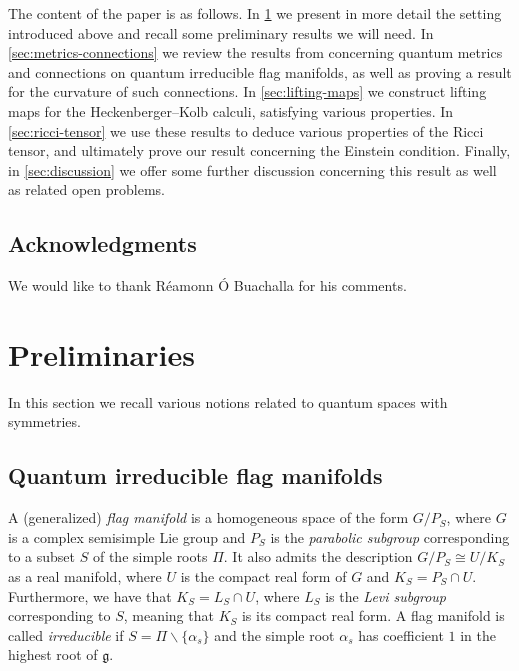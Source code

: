 \documentclass[a4paper,12pt,reqno,english]{amsart}
\numberwithin{equation}{section}
\numberwithin{figure}{section}
\theoremstyle{plain}
\theoremstyle{plain}
\theoremstyle{plain}
\theoremstyle{plain}
\theoremstyle{plain}
\theoremstyle{definition}
\theoremstyle{definition}
\theoremstyle{definition}
\theoremstyle{remark}
\theoremstyle{definition}
\newcommand{\lieg}{\mathfrak{g}}
\begin{document}
The content of the paper is as follows.
In \cref{sec:preliminaries} we present in more detail the setting introduced above and recall some preliminary results we will need.
In \cref{sec:metrics-connections} we review the results from \cite{levicivita-irreducible} concerning quantum metrics and connections on quantum irreducible flag manifolds, as well as proving a result for the curvature of such connections.
In \cref{sec:lifting-maps} we construct lifting maps for the Heckenberger--Kolb calculi, satisfying various properties.
In \cref{sec:ricci-tensor} we use these results to deduce various properties of the Ricci tensor, and ultimately prove our result concerning the Einstein condition.
Finally, in \cref{sec:discussion} we offer some further discussion concerning this result as well as related open problems.

\subsection*{Acknowledgments}

We would like to thank Réamonn Ó Buachalla for his comments.

\section{Preliminaries}
\label{sec:preliminaries}

In this section we recall various notions related to quantum spaces with symmetries.

\subsection{Quantum irreducible flag manifolds}

A (generalized) \emph{flag manifold} is a homogeneous space of the form $G / P_S$, where $G$ is a complex semisimple Lie group and $P_S$ is the \emph{parabolic subgroup} corresponding to a subset $S$ of the simple roots $\Pi$.
It also admits the description $G / P_S \cong U / K_S$ as a real manifold, where $U$ is the compact real form of $G$ and $K_S = P_S \cap U$. Furthermore, we have that $K_S = L_S \cap U$, where $L_S$ is the \emph{Levi subgroup} corresponding to $S$, meaning that $K_S$ is its compact real form.
A flag manifold is called \emph{irreducible} if $S = \Pi \backslash \{\alpha_s\}$ and the simple root $\alpha_s$ has coefficient $1$ in the highest root of $\lieg$.
\end{document}
